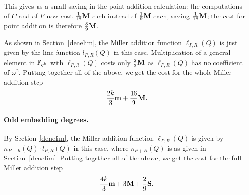 This gives us a small saving in the point addition calculation: the computations of $C$ and of $F$ now cost $\frac{1}{18}\textbf{M}$ each instead of $\frac{1}{9}\textbf{M}$ each, saving $\frac{1}{18}\textbf{M}$; 
the cost for point addition is therefore $\frac{8}{9}\textbf{M}$.

As shown in Section~\ref{denelim}, the Miller addition function $\ell_{P,R}(Q)$
is just given by the line function $l_{P,R}(Q)$ in this case. Multiplication of a general element in $\mathbb{F}_{q^k}$ with $\ell_{P,R}(Q)$ costs only $\frac{2}{3}\textbf{M}$
as $\ell_{P,R}(Q)$ has no coefficient of $\omega^2$.
Putting together all of the above, we get the cost for the whole Miller addition step
$$\frac{2k}{3}\textbf{m} + \frac{16}{9}\textbf{M}.$$

\paragraph*{Odd embedding degrees.}

By Section~\ref{denelim}, the Miller addition function 
$\ell_{P,R}(Q)$ is given by $n_{P+R}(Q) \cdot l_{P,R}(Q)$ in this case, where
$n_{P+R}(Q)$ is as given in Section~\ref{denelim}.
Putting together all of the above, we get the cost for the full Miller addition step
$$\frac{4k}{3}\textbf{m} + 3\textbf{M} + \frac{2}{9}\textbf{S}.$$

